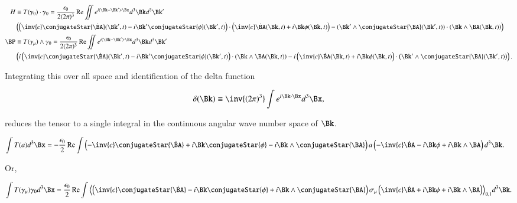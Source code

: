 \begin{align*}
H &\equiv
T(\gamma_0) \cdot \gamma_0 = \frac{\epsilon_0}{2 (2 \pi)^3} \Real \iint
e^{i (\Bk -\Bk') \cdot \Bx } d^3 \Bk d^3 \Bk' \\
&\left(
\left(
\inv{c} \conjugateStar{\dot{\BA}}(\Bk',t)
- i \Bk' \conjugateStar{\phi}(\Bk', t)
\right)
\cdot
\left(
\inv{c} \dot{\BA}(\Bk, t)
+ i \Bk \phi(\Bk, t)
\right)
- (\Bk' \wedge \conjugateStar{\BA}(\Bk', t)) \cdot (\Bk \wedge \BA(\Bk, t))
\right)
\\
\BP &\equiv
T(\gamma_\mu) \wedge \gamma_0 = \frac{\epsilon_0}{2 (2 \pi)^3} \Real \iint
e^{i (\Bk -\Bk') \cdot \Bx } d^3 \Bk d^3 \Bk' \\
&\left(
i
\left(
\inv{c} \conjugateStar{\dot{\BA}}(\Bk',t)
- i \Bk' \conjugateStar{\phi}(\Bk', t)
\right) \cdot
\left(
\Bk \wedge \BA(\Bk, t)
\right)
-i
\left(
\inv{c} \dot{\BA}(\Bk, t)
+ i \Bk \phi(\Bk, t)
\right)
\cdot
\left(
\Bk' \wedge \conjugateStar{\BA}(\Bk', t)
\right)
\right).
\end{align*}

Integrating this over all space and identification of the delta function

\begin{align}
\label{eqn:ftMaxVacuum:9}
\delta(\Bk) \equiv \inv{(2 \pi)^3} \int e^{i \Bk \cdot \Bx} d^3 \Bx,
\end{align}

reduces the tensor to a single integral in the continuous angular wave number space of $\Bk$.

\begin{align}
\label{eqn:ftMaxVacuum:10}
\int T(a) d^3 \Bx &= -\frac{\epsilon_0}{2} \Real \int
\left(
- \inv{c} \conjugateStar{\dot{\BA}}
+ i \Bk \conjugateStar{\phi}
- i \Bk \wedge \conjugateStar{\BA}
\right)
a
\left(
- \inv{c} \dot{\BA}
- i \Bk \phi
+ i \Bk \wedge \BA
\right)
d^3 \Bk.
\end{align}

Or,

\begin{align}
\label{eqn:ftMaxVacuum:12}
\int T(\gamma_\mu) \gamma_0 d^3 \Bx =
\frac{\epsilon_0}{2} \Real \int
\gpgrade{
\left(
\inv{c} \conjugateStar{\dot{\BA}}
- i \Bk \conjugateStar{\phi}
+ i \Bk \wedge \conjugateStar{\BA}
\right)
\sigma_\mu
\left(
\inv{c} \dot{\BA}
+ i \Bk \phi
+ i \Bk \wedge \BA
\right)
}{0,1}
d^3 \Bk.
\end{align}

